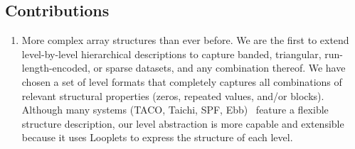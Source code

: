 \subsection{Contributions}

\begin{enumerate}
\item 

More complex array structures than ever before. We are the first to extend level-by-level hierarchical descriptions to capture
banded, triangular, run-length-encoded, or sparse datasets, and any combination
thereof. We have chosen a set of level formats that completely captures all combinations of relevant
structural properties (zeros, repeated values, and/or blocks). Although many systems (TACO, Taichi, SPF, Ebb)~\cite{chou2018format,  hu_taichi_2019, strout2018sparse, bernstein2016ebb} feature a flexible structure description, our level abstraction is more capable and extensible because it uses Looplets \cite{ahrens_looplets_2023} to express the structure of each level. 


\end{enumerate}
